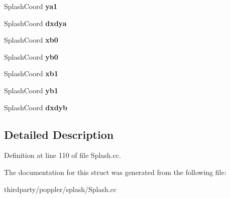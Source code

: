 \begin{DoxyCompactItemize}
Splash\+Coord {\bfseries ya1}
\item 
\mbox{\label{struct_image_section_a5df580d93ace7e8e674aeacbeb256fa2}} 
Splash\+Coord {\bfseries dxdya}
\item 
\mbox{\label{struct_image_section_a5ad105cab840f8021c154f40bef5c855}} 
Splash\+Coord {\bfseries xb0}
\item 
\mbox{\label{struct_image_section_a54ee945d0280d9889ad4fb1efad59223}} 
Splash\+Coord {\bfseries yb0}
\item 
\mbox{\label{struct_image_section_a47989c54a8cb51e9372c3d850c02c2c2}} 
Splash\+Coord {\bfseries xb1}
\item 
\mbox{\label{struct_image_section_acc3844f9149f8db4b0205d6f78d707a8}} 
Splash\+Coord {\bfseries yb1}
\item 
\mbox{\label{struct_image_section_a8a090a07d71bcb3577c3ecfb2850c1d7}} 
Splash\+Coord {\bfseries dxdyb}
\end{DoxyCompactItemize}


\subsection{Detailed Description}


Definition at line 110 of file Splash.\+cc.



The documentation for this struct was generated from the following file\+:\begin{DoxyCompactItemize}
\item 
thirdparty/poppler/splash/Splash.\+cc\end{DoxyCompactItemize}
